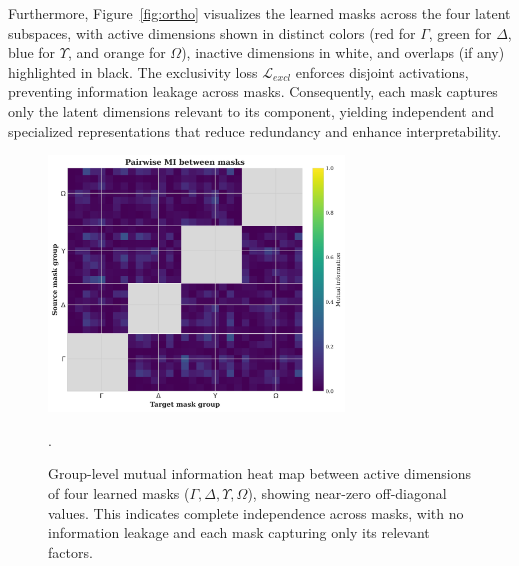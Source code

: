 \documentclass[doubleblind]{ecai}
\begin{document}
	Furthermore, Figure~\ref{fig:ortho} visualizes the learned masks across the four latent subspaces, 
	with active dimensions shown in distinct colors (red for $\Gamma$, green for $\Delta$, blue for $\Upsilon$, and orange for $\Omega$), 
	inactive dimensions in white, and overlaps (if any) highlighted in black. 
	The exclusivity loss $\mathcal{L}_{\mathit{excl}}$ enforces disjoint activations, preventing information leakage across masks. 
	Consequently, each mask captures only the latent dimensions relevant to its component, yielding independent and specialized representations 
	that reduce redundancy and enhance interpretability.
	
	
		\begin{figure}[h]
		\centering
		
		\includegraphics[width=0.7\textwidth]{Images/MI.png}
		
		\caption{
			Group-level mutual information heat map between active dimensions of four learned masks (\(\Gamma, \Delta, \Upsilon, \Omega\)), 
			showing near-zero off-diagonal values. This indicates complete independence across masks, with no information leakage 
			and each mask capturing only its relevant factors.
		}
		
		.
		
		
		\label{fig:mi}
		
	\end{figure}
	
\end{document}
